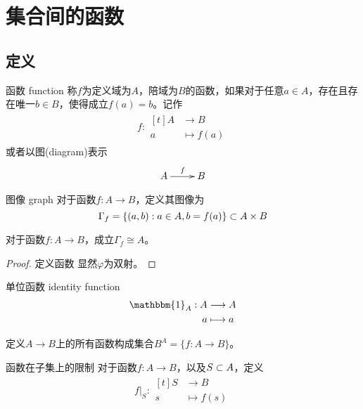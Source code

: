 \section{集合间的函数}

\subsection{定义}

\begin{definition}{函数 function}
	称$f$为定义域为$A$，陪域为$B$的函数，如果对于任意$a\in A$，存在且存在唯一$b\in B$，使得成立$f(a)=b$。记作
	\begin{align*}
		f: \begin{aligned}[t]
			A&\longrightarrow B\\
			a&\longmapsto f(a)
		\end{aligned}
	\end{align*}
	或者以图(diagram)表示
	$$
	\xymatrix{
		A \ar^f[r] &B
	}
	$$
\end{definition}

\begin{definition}{图像 graph}
	对于函数$f:A\to B$，定义其图像为
	$$
	\Gamma_f=\{ (a,b):a\in A,b=f(a) \}\subset A\times B
	$$
\end{definition}

\begin{proposition}
	对于函数$f:A\to B$，成立$\Gamma_f\cong A$。
\end{proposition}

\begin{proof}
	定义函数
	显然$\varphi$为双射。
\end{proof}

\begin{definition}{单位函数 identity function}
	\begin{align*}
		\mathbbm{1}_A:\begin{aligned}[t]
			A&\longrightarrow A\\
			a&\longmapsto a
		\end{aligned}
	\end{align*}
\end{definition}

\begin{definition}
	定义$A\to B$上的所有函数构成集合$B^A=\{ f:A\to B \}$。
\end{definition}

\begin{definition}{函数在子集上的限制}
	对于函数$f:A\to B$，以及$S\subset A$，定义
	\begin{align*}
		f|_S:\begin{aligned}[t]
			S&\longrightarrow B\\
			s&\longmapsto f(s)
		\end{aligned}
	\end{align*}
\end{definition}


